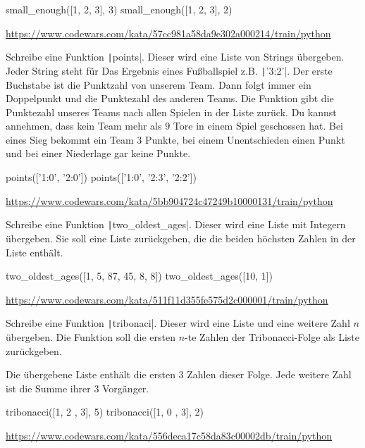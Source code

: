 \documentclass[class=scrartcl, crop=false]{standalone}
\begin{document}
\begin{pyconsole}
small_enough([1, 2, 3], 3)
small_enough([1, 2, 3], 2)
\end{pyconsole}

\url{https://www.codewars.com/kata/57cc981a58da9e302a000214/train/python}


\begin{aufgabe}
Schreibe eine Funktion \texttt|points|. Dieser wird eine Liste von Strings übergeben. Jeder String steht für Das Ergebnis eines Fußballspiel z.B. \texttt|'3:2'|. Der erste Buchstabe ist die Punktzahl von unserem Team. Dann folgt immer ein Doppelpunkt und die Punktezahl des anderen Teams. Die Funktion gibt die Punktezahl unseres Teams nach allen Spielen in der Liste zurück. Du kannst annehmen, dass kein Team mehr als $9$ Tore in einem Spiel geschossen hat. Bei eines Sieg bekommt ein Team $3$ Punkte, bei einem Unentschieden einen Punkt und bei einer Niederlage gar keine Punkte.
\begin{pyconsole}
points(['1:0', '2:0'])
points(['1:0', '2:3', '2:2'])
\end{pyconsole}

\url{https://www.codewars.com/kata/5bb904724c47249b10000131/train/python}
\end{aufgabe}

\begin{aufgabe}
Schreibe eine Funktion \texttt|two_oldest_ages|. Dieser wird eine Liste mit Integern übergeben. Sie soll eine Liste zurückgeben, die die beiden höchsten Zahlen in der Liste enthält.

\begin{pyconsole}
two_oldest_ages([1, 5, 87, 45, 8, 8])
two_oldest_ages([10, 1])
\end{pyconsole}

\url{https://www.codewars.com/kata/511f11d355fe575d2c000001/train/python}
\end{aufgabe}


\begin{aufgabe}
Schreibe eine Funktion \texttt|tribonaci|. Dieser wird eine Liste und eine weitere Zahl $n$ übergeben. Die Funktion soll die ersten  $n$-te Zahlen der Tribonacci-Folge als Liste zurückgeben.

Die übergebene Liste enthält die ersten $3$ Zahlen dieser Folge. Jede weitere Zahl ist die Summe ihrer $3$ Vorgänger.

\begin{pyconsole}
tribonacci([1, 2 , 3], 5)
tribonacci([1, 0 , 3], 2)
\end{pyconsole}

\url{https://www.codewars.com/kata/556deca17c58da83c00002db/train/python}
\end{aufgabe}
\end{document}
